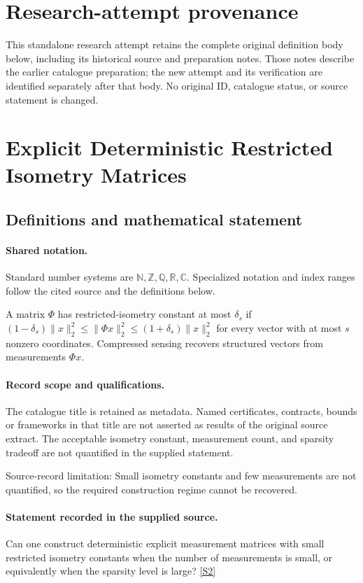 \documentclass[11pt]{article}
\begin{document}
\section*{Research-attempt provenance}
This standalone research attempt retains the complete original definition body below,
including its historical source and preparation notes. Those notes describe the
earlier catalogue preparation; the new attempt and its verification are identified
separately after that body. No original ID, catalogue status, or source statement is changed.

\section{Explicit Deterministic Restricted Isometry Matrices}\label{statement}

\subsection{Definitions and mathematical statement}

\paragraph{Shared notation.}Standard number systems are $\mathbb N,\mathbb Z,\mathbb Q,\mathbb R,\mathbb C$. Specialized notation and index ranges follow the cited source and the definitions below.


A matrix $\Phi$ has restricted-isometry constant at most $\delta_s$ if $(1-\delta_s)\lVert x\rVert_2^2\leq\lVert\Phi x\rVert_2^2\leq(1+\delta_s)\lVert x\rVert_2^2$ for every vector with at most $s$ nonzero coordinates. Compressed sensing recovers structured vectors from measurements $\Phi x$.
\paragraph{Record scope and qualifications.}
The catalogue title is retained as metadata. Named certificates, contracts, bounds or frameworks in that title are not asserted as results of the original source extract.
The acceptable isometry constant, measurement count, and sparsity tradeoff are not quantified in the supplied statement.

Source-record limitation: Small isometry constants and few measurements are not quantified, so the required construction regime cannot be recovered.
\paragraph{Statement recorded in the supplied source.}
Can one construct deterministic explicit measurement matrices with small restricted isometry constants when the number of measurements is small, or equivalently when the sparsity level is large? \href{https://doi.org/10.4171/owr/2010/33}{[S2]}
\end{document}
